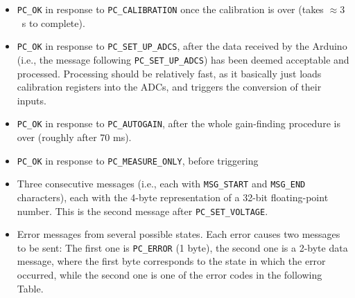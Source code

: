 \documentclass[11pt,a4paper,english]{article}
\begin{document}
\begin{itemize}
\item \texttt{PC\_OK} in response to \texttt{PC\_CALIBRATION} once the calibration is over (takes $\approx3$~s to complete).
\item \texttt{PC\_OK} in response to \texttt{PC\_SET\_UP\_ADCS}, after the data received by the Arduino (i.e., the message following \texttt{PC\_SET\_UP\_ADCS}) has been deemed acceptable and processed. Processing should be relatively fast, as it basically just loads calibration registers into the ADCs, and triggers the conversion of their inputs.
\item \texttt{PC\_OK} in response to \texttt{PC\_AUTOGAIN}, after the whole gain-finding procedure is over (roughly after 70 ms).
\item \texttt{PC\_OK} in response to \texttt{PC\_MEASURE\_ONLY}, before triggering
\item Three consecutive messages (i.e., each with \texttt{MSG\_START} and \texttt{MSG\_END} characters), each with the 4-byte representation of a 32-bit floating-point number. This is the second message after \texttt{PC\_SET\_VOLTAGE}.
\item Error messages from several possible states. Each error causes two messages to be sent: The first one is \texttt{PC\_ERROR} (1 byte), the second one is a 2-byte data message, where the first byte corresponds to the state in which the error occurred, while the second one is one of the error codes in the following Table.


\end{itemize}
\end{document}
